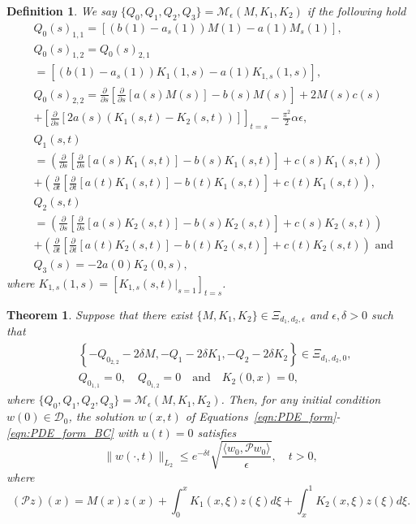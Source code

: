 \documentclass[9pt,journal,twocolumn]{IEEEtran}
\newtheorem{theorem}{Theorem}
\newtheorem{definition}{Definition}
\newcommand{\pfs}{\frac{\partial}{\partial s}}
\newcommand{\igzx}{\int_0^x}
\newcommand{\igxo}{\int_x^1}
\newcommand{\pft}{\frac{\partial}{\partial t}}
\begin{document}
\begin{definition}\label{def:stab_map}
We say $\{Q_0,Q_1,Q_2,Q_3\}=\mathcal{M}_\epsilon(M,K_1,K_2)$ if the following hold
\begin{align}
 &Q_0(s)_{1,1}=\left[\left(b(1)-a_s(1) \right)M(1)-a(1)M_s(1) \right],\\
 &Q_0(s)_{1,2}=Q_0(s)_{2,1} \nonumber \\
 &=\left[\left(b(1)-a_s(1) \right)K_1(1,s)-a(1)K_{1,s}(1,s) \right], \\
&Q_0(s)_{2,2}=\pfs \left[ \pfs \left[ a(s)M(s)\right]-b(s)M(s) \right]+2M(s)c(s) \nonumber \\
&   +  \left[\pfs \left[2a(s)\left(K_1(s,t)-K_2(s,t) \right) \right] \right]_{t=s}-\frac{\pi^2}{2}\alpha \epsilon ,\\
&Q_1(s,t) \nonumber \\
&=\left(\pfs \left[\pfs \left[a(s)K_1(s,t)\right]-b(s)K_1(s,t) \right]+c(s)K_1(s,t) \right) \nonumber \\
&+\left(\pft \left[\pft \left[a(t)K_1(s,t)\right]-b(t)K_1(s,t) \right]+c(t)K_1(s,t) \right), \\ 
&Q_2(s,t)\nonumber \\
&=\left(\pfs \left[\pfs \left[a(s)K_2(s,t)\right]-b(s)K_2(s,t) \right]+c(s)K_2(s,t) \right) \nonumber \\
&+\left(\pft \left[\pft \left[a(t)K_2(s,t)\right]-b(t)K_2(s,t) \right]+c(t)K_2(s,t) \right)\text{ and }\\
&Q_3(s)=-2a(0)K_2(0,s),
\end{align} where $ K_{1,s}(1,s)=\left[K_{1,s}(s,t)|_{s=1} \right]_{t=s}$.
\end{definition}

\begin{theorem}\label{thm:stability}
Suppose that there exist $\{M,K_1,K_2\} \in \Xi_{d_1,d_2,\epsilon}$ and $\epsilon,\delta>0$ such that
\begin{align*}
 &\left\{-Q_{0_{2,2}}- 2\delta M,-Q_1- 2\delta K_1,-Q_2-  2\delta K_2\right\} \in \Xi_{d_1,d_2,0}, \\
 &Q_{0_{1,1}}=0, \quad Q_{0_{1,2}}=0 \quad \text{and} \quad K_2(0,x)=0,
\end{align*}
where $\{Q_0,Q_1,Q_2,Q_3\}=\mathcal{M}_\epsilon(M,K_1,K_2)$. Then, for any initial condition $w(0) \in \mathcal{D}_0$, the solution $w(x,t)$ of Equations~\eqref{eqn:PDE_form}-\eqref{eqn:PDE_form_BC} with $u(t)=0$ satisfies
\[
\|w(\cdot,t)\|_{L_2} \leq e^{-\delta t} \sqrt{\frac{\langle w_0,\mathcal{P}w_0 \rangle}{\epsilon}}, \quad t > 0,
\]
where
\[
(\mathcal{P}z)(x)=M(x)z(x) + \igzx K_1(x,\xi) z(\xi) d \xi + \igxo K_2(x,\xi) z(\xi) d \xi.
\]
\end{theorem}
\end{document}
